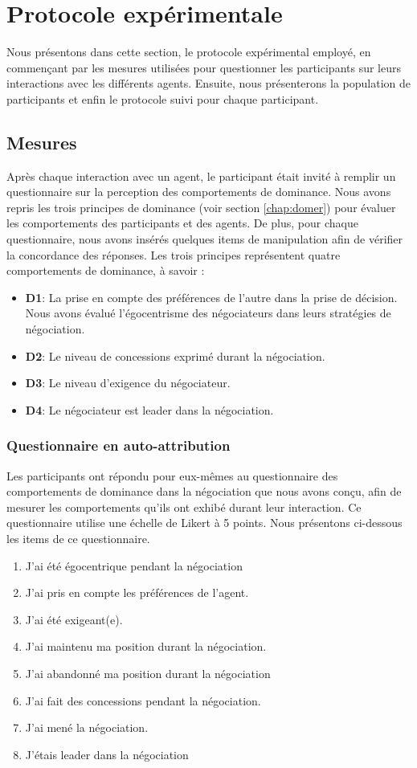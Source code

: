 \section{Protocole expérimentale}
\label{sec:procedure}
Nous présentons dans cette section, le protocole expérimental employé, en commençant par les mesures utilisées pour questionner les participants sur leurs interactions avec les différents agents. Ensuite, nous présenterons la population de participants et enfin le protocole suivi pour chaque participant. 

\subsection{Mesures}
Après chaque interaction avec un agent, le participant était invité à remplir un questionnaire sur la perception des comportements de dominance.
Nous avons repris les trois principes de dominance (voir section \ref{chap:domer}) pour évaluer les comportements des participants et des agents. De plus, pour chaque questionnaire, nous avons insérés quelques items de manipulation afin de vérifier la concordance des réponses.  Les trois principes représentent quatre comportements de dominance, à savoir :
	\begin{itemize}
		\item \textbf{D1}: La prise en compte des préférences de l'autre dans la prise de décision. Nous avons évalué l'égocentrisme des négociateurs dans leurs stratégies de négociation. 
		\item \textbf{D2}: Le niveau de concessions exprimé durant la négociation.
		\item \textbf{D3}: Le niveau d'exigence du négociateur.
		\item \textbf{D4}: Le négociateur est leader dans la négociation.
	\end{itemize}

\subsubsection{Questionnaire en auto-attribution} Les participants ont répondu pour eux-mêmes au questionnaire des comportements de dominance dans la négociation que nous avons conçu, afin de mesurer les comportements qu'ils ont exhibé durant leur interaction. Ce questionnaire utilise une échelle de Likert à 5 points. Nous présentons ci-dessous les items de ce questionnaire. 
\begin{enumerate}
	\item J'ai été égocentrique pendant la négociation
	\item J'ai pris en compte les préférences de l'agent.
	\item J'ai été exigeant(e).
	\item J'ai maintenu ma position durant la négociation.
	\item J'ai abandonné ma position durant la négociation
	\item J'ai fait des concessions pendant la négociation.	
	\item J'ai mené la négociation.
	\item J'étais leader dans la négociation
\end{enumerate}

